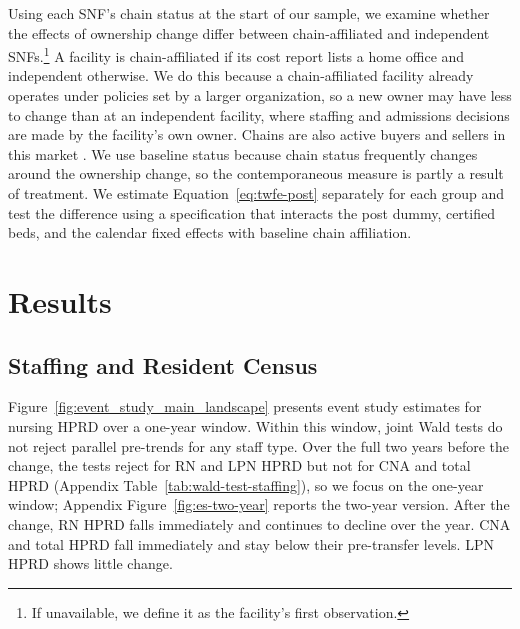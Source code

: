 \documentclass[12pt]{article}
\begin{document}
Using each SNF’s chain status at the start of our sample, we examine whether the effects of ownership change differ between chain-affiliated and independent SNFs.\footnote{If unavailable, we define it as the facility’s first observation.} A facility is chain-affiliated if its cost report lists a home office and independent otherwise. We do this because a chain-affiliated facility already operates under policies set by a larger organization, so a new owner may have less to change than at an independent facility, where staffing and admissions decisions are made by the facility’s own owner. Chains are also active buyers and sellers in this market \citep{Grabowski2016LowQualityNH, prusynski_humbert_mroz_2023}. We use baseline status because chain status frequently changes around the ownership change, so the contemporaneous measure is partly a result of treatment. We estimate Equation~\ref{eq:twfe-post} separately for each group and test the difference using a specification that interacts the post dummy, certified beds, and the calendar fixed effects with baseline chain affiliation.

\section{Results} \label{sec:results}

\subsection{Staffing and Resident Census}

Figure~\ref{fig:event_study_main_landscape} presents event study estimates for nursing HPRD over a one-year window. Within this window, joint Wald tests do not reject parallel pre-trends for any staff type. Over the full two years before the change, the tests reject for RN and LPN HPRD but not for CNA and total HPRD (Appendix Table~\ref{tab:wald-test-staffing}), so we focus on the one-year window; Appendix Figure~\ref{fig:es-two-year} reports the two-year version. After the change, RN HPRD falls immediately and continues to decline over the year. CNA and total HPRD fall immediately and stay below their pre-transfer levels. LPN HPRD shows little change.

\end{document}
